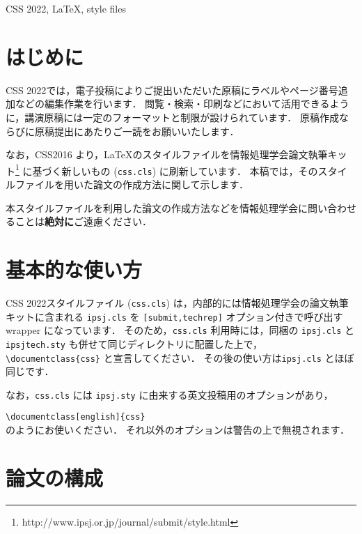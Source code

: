 \documentclass{css}
\def\|{\verb|}
\newcommand{\cssname}[0]{CSS 2022}
\begin{document}
\begin{ekeyword}
\cssname, \LaTeX, style files
\end{ekeyword}

%% if you use english opsion, you should put your English abstract in the abstract environment.
%% eabstract is not displayed in english mode.

\maketitle

%1
\section{はじめに}

\cssname では，電子投稿によりご提出いただいた原稿にラベルやページ番号追加などの編集作業を行います．
閲覧・検索・印刷などにおいて活用できるように，講演原稿には一定のフォーマットと制限が設けられています．
原稿作成ならびに原稿提出にあたりご一読をお願いいたします．

なお，CSS2016 より，\LaTeX のスタイルファイルを情報処理学会論文執筆キット\footnote{http://www.ipsj.or.jp/journal/submit/style.html} に基づく新しいもの (\|css.cls|) に刷新しています．
本稿では，そのスタイルファイルを用いた論文の作成方法に関して示します．

本スタイルファイルを利用した論文の作成方法などを情報処理学会に問い合わせることは\textbf{絶対に}ご遠慮ください．

\section{基本的な使い方}

\cssname スタイルファイル (\|css.cls|) は，内部的には情報処理学会の論文執筆キットに含まれる \|ipsj.cls| を \|[submit,techrep]| オプション付きで呼び出す wrapper になっています．
そのため，\|css.cls| 利用時には，同梱の \|ipsj.cls| と \|ipsjtech.sty| も併せて同じディレクトリに配置した上で，\|\documentclass{css}| と宣言してください．
その後の使い方は\|ipsj.cls| とほぼ同じです．

なお，\|css.cls| には \|ipsj.sty| に由来する英文投稿用のオプションがあり，

\noindent
\|\documentclass[english]{css} |\\
のようにお使いください．
それ以外のオプションは警告の上で無視されます．

\section{論文の構成}
\end{document}

